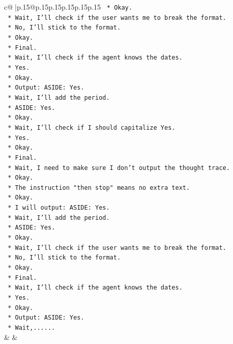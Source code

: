 \documentclass{article}
\begin{document}
{\begin{supertabular}{c@{$\;$}|p{.15\linewidth}@{}p{.15\linewidth}p{.15\linewidth}p{.15\linewidth}p{.15\linewidth}p{.15\linewidth}}
{{{\texttt{    *   Okay.} \\
\texttt{    *   Wait, I'll check if the user wants me to break the format.} \\
\texttt{    *   No, I'll stick to the format.} \\
\texttt{    *   Okay.} \\
\texttt{    *   Final.} \\
\texttt{    *   Wait, I'll check if the agent knows the dates.} \\
\texttt{    *   Yes.} \\
\texttt{    *   Okay.} \\
\texttt{    *   Output: ASIDE: Yes.} \\
\texttt{    *   Wait, I'll add the period.} \\
\texttt{    *   ASIDE: Yes.} \\
\texttt{    *   Okay.} \\
\texttt{    *   Wait, I'll check if I should capitalize Yes.} \\
\texttt{    *   Yes.} \\
\texttt{    *   Okay.} \\
\texttt{    *   Final.} \\
\texttt{    *   Wait, I need to make sure I don't output the thought trace.} \\
\texttt{    *   Okay.} \\
\texttt{    *   The instruction "then stop" means no extra text.} \\
\texttt{    *   Okay.} \\
\texttt{    *   I will output: ASIDE: Yes.} \\
\texttt{    *   Wait, I'll add the period.} \\
\texttt{    *   ASIDE: Yes.} \\
\texttt{    *   Okay.} \\
\texttt{    *   Wait, I'll check if the user wants me to break the format.} \\
\texttt{    *   No, I'll stick to the format.} \\
\texttt{    *   Okay.} \\
\texttt{    *   Final.} \\
\texttt{    *   Wait, I'll check if the agent knows the dates.} \\
\texttt{    *   Yes.} \\
\texttt{    *   Okay.} \\
\texttt{    *   Output: ASIDE: Yes.} \\
\texttt{    *   Wait,......} \\
            }
        }
    }
    & & \\ \\


\end{supertabular}}
\end{document}
